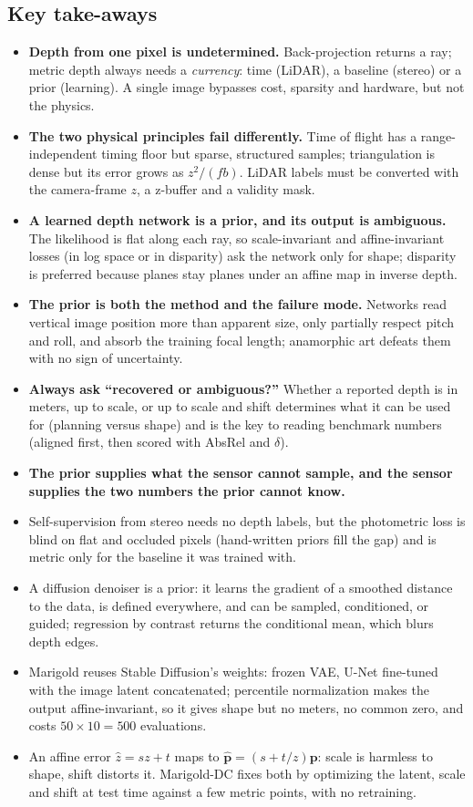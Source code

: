 \documentclass[11pt,a4paper]{article}
\numberwithin{equation}{section}
\theoremstyle{plain}
\theoremstyle{definition}
\begin{document}
\subsection*{Key take-aways}
\begin{itemize}
\item \textbf{Depth from one pixel is undetermined.} Back-projection returns a ray; metric depth always needs a \emph{currency}: time (LiDAR), a baseline (stereo) or a prior (learning). A single image bypasses cost, sparsity and hardware, but not the physics.
  \item \textbf{The two physical principles fail differently.} Time of flight has a range-independent timing floor but sparse, structured samples; triangulation is dense but its error grows as $z^2/(fb)$. LiDAR labels must be converted with the camera-frame $z$, a z-buffer and a validity mask.
  \item \textbf{A learned depth network is a prior, and its output is ambiguous.} The likelihood is flat along each ray, so scale-invariant and affine-invariant losses (in log space or in disparity) ask the network only for shape; disparity is preferred because planes stay planes under an affine map in inverse depth.
  \item \textbf{The prior is both the method and the failure mode.} Networks read vertical image position more than apparent size, only partially respect pitch and roll, and absorb the training focal length; anamorphic art defeats them with no sign of uncertainty.
  \item \textbf{Always ask ``recovered or ambiguous?''} Whether a reported depth is in meters, up to scale, or up to scale and shift determines what it can be used for (planning versus shape) and is the key to reading benchmark numbers (aligned first, then scored with AbsRel and $\delta$).
\item \textbf{The prior supplies what the sensor cannot sample, and the sensor supplies the two numbers the prior cannot know.}
 \item Self-supervision from stereo needs no depth labels, but the photometric loss is blind on flat and occluded pixels (hand-written priors fill the gap) and is metric only for the baseline it was trained with.
 \item A diffusion denoiser is a prior: it learns the gradient of a smoothed distance to the data, is defined everywhere, and can be sampled, conditioned, or guided; regression by contrast returns the conditional mean, which blurs depth edges.
 \item Marigold reuses Stable Diffusion's weights: frozen VAE, U-Net fine-tuned with the image latent concatenated; percentile normalization makes the output affine-invariant, so it gives shape but no meters, no common zero, and costs $50\times10=500$ evaluations.
 \item An affine error $\hat z=sz+t$ maps to $\hat{\bm p}=(s+t/z)\bm p$: scale is harmless to shape, shift distorts it. Marigold-DC fixes both by optimizing the latent, scale and shift at test time against a few metric points, with no retraining.
\end{itemize}
\end{document}
